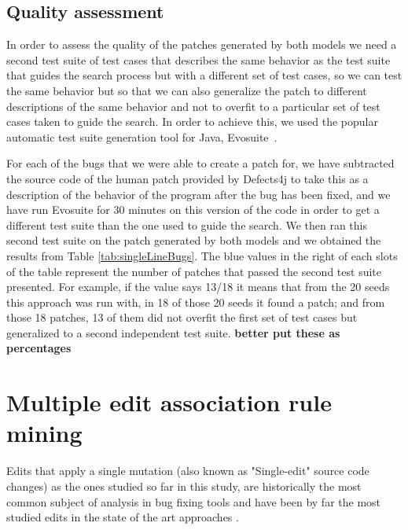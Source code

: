 \documentclass[conference]{IEEEtran}
\newcommand{\todo}[1]
  {{\scriptsize \textbf{\color{red} {#1}}}}
\begin{document}
\subsection{Quality assessment}
In order to assess the quality of the patches generated by both models we need a second test suite of test cases that describes the same behavior as the test suite that guides the search process but with a different set of test cases, so we can test the same behavior but so that we can also generalize the patch to different descriptions of the same behavior and not to overfit to a particular set of test cases taken to guide the search. In order to achieve this, we used the popular automatic test suite generation tool for Java, Evosuite~\cite{fraser11}.

For each of the bugs that we were able to create a patch for, we have subtracted the source code of the human patch provided by Defects4j to take this as a description of the behavior of the program after the bug has been fixed, and we have run Evosuite for 30 minutes on this version of the code in order to get a different test suite than the one used to guide the search. We then ran this second test suite on the patch generated by both models and we obtained the results from Table \ref{tab:singleLineBugs}. The blue values in the right of each slots of the table represent the number of patches that passed the second test suite presented. For example, if the value says 13/18 it means that from the 20 seeds this approach was run with, in 18 of those 20 seeds it found a patch; and from those 18 patches, 13 of them did not overfit the first set of test cases but generalized to a second independent test suite. \todo{better put these as percentages}



\section{Multiple edit association rule mining} \label{multEdit}

Edits that apply a single mutation (also known as "Single-edit" source code 
changes) as the ones studied so far in this study, are historically the most 
common subject of analysis in bug fixing tools and have been by far the most 
studied edits in the state of the art approaches 
\cite{Qi15,fan15,kim2013,Long2016,legoues12,Qi13,Qi14,xuan16}.
\end{document}
